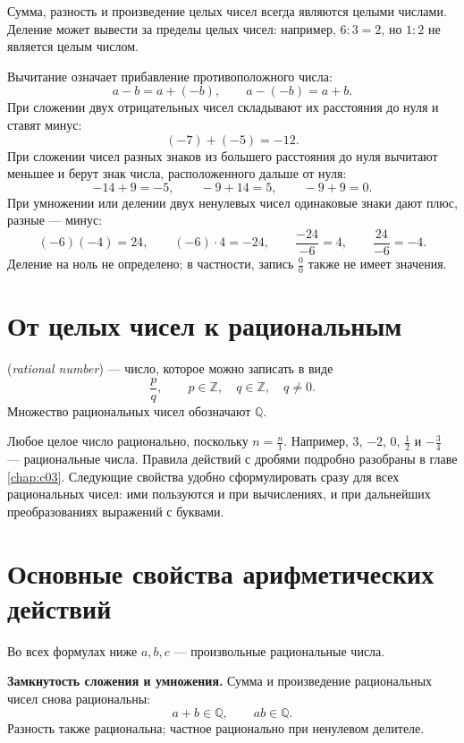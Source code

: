 Сумма, разность и произведение целых чисел всегда являются целыми числами.
Деление может вывести за пределы целых чисел: например, \(6:3=2\), но \(1:2\) не является целым числом.

Вычитание означает прибавление противоположного числа:
\[
a-b=a+(-b),\qquad a-(-b)=a+b.
\]
При сложении двух отрицательных чисел складывают их расстояния до нуля и ставят минус:
\[
(-7)+(-5)=-12.
\]
При сложении чисел разных знаков из большего расстояния до нуля вычитают меньшее
и берут знак числа, расположенного дальше от нуля:
\[
-14+9=-5,\qquad -9+14=5,\qquad -9+9=0.
\]
При умножении или делении двух ненулевых чисел одинаковые знаки дают плюс, разные --- минус:
\[
(-6)(-4)=24,\qquad (-6)\cdot4=-24,\qquad
\frac{-24}{-6}=4,\qquad \frac{24}{-6}=-4.
\]
Деление на ноль не определено; в частности, запись \(\frac{0}{0}\) также не имеет значения.

\section{От целых чисел к рациональным}

\begin{definition}
 (\emph{rational number}) --- число, которое можно записать в виде
\[
\frac pq,\qquad p\in\mathbb Z,\quad q\in\mathbb Z,\quad q\ne0.
\]
Множество рациональных чисел обозначают \(\mathbb Q\).
\end{definition}

Любое целое число рационально, поскольку \(n=\frac n1\).
Например, \(3\), \(-2\), \(0\), \(\frac12\) и \(-\frac34\) --- рациональные числа.
Правила действий с дробями подробно разобраны в главе \ref{chap:c03}.
Следующие свойства удобно сформулировать сразу для всех рациональных чисел:
ими пользуются и при вычислениях, и при дальнейших преобразованиях выражений с буквами.

\section{Основные свойства арифметических действий}

Во всех формулах ниже \(a,b,c\) --- произвольные рациональные числа.

\textbf{Замкнутость сложения и умножения.}
Сумма и произведение рациональных чисел снова рациональны:
\[
a+b\in\mathbb Q,\qquad ab\in\mathbb Q.
\]
Разность также рациональна; частное рационально при ненулевом делителе.


